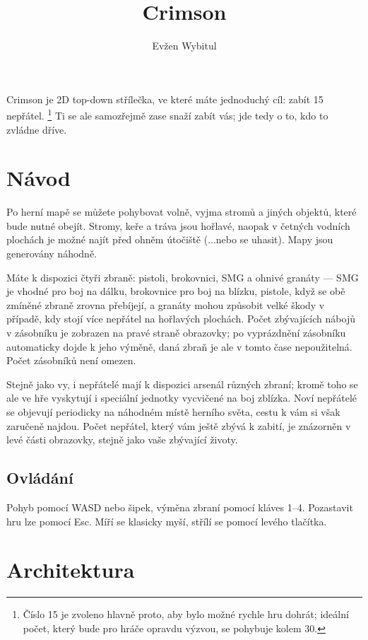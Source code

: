 \documentclass[BCOR=0pt]{scrartcl}
\title{Crimson}
\author{Evžen Wybitul}
\date{}
\begin{document}
\maketitle

Crimson je 2D top-down střílečka, ve které máte jednoduchý cíl: zabít 15 nepřátel. \footnote{Číslo 15 je zvoleno hlavně proto, aby bylo možné rychle hru dohrát; ideální počet, který bude pro hráče opravdu výzvou, se pohybuje kolem 30.} Ti se ale samozřejmě zase snaží zabít vás; jde tedy o to, kdo to zvládne dříve.

\section{Návod}

Po herní mapě se můžete pohybovat volně, vyjma stromů a jiných objektů, které bude nutné obejít. Stromy, keře a tráva jsou hořlavé, naopak v četných vodních plochách je možné najít před ohněm útočiště (...nebo se uhasit). Mapy jsou generovány náhodně.

Máte k dispozici čtyři zbraně: pistoli, brokovnici, SMG a ohnivé granáty --- SMG je vhodné pro boj na dálku, brokovnice pro boj na blízku, pistole, když se obě zmíněné zbraně zrovna přebíjejí, a granáty mohou způsobit velké škody v případě, kdy stojí více nepřátel na hořlavých plochách. Počet zbývajících nábojů v zásobníku je zobrazen na pravé straně obrazovky; po vyprázdnění zásobníku automaticky dojde k jeho výměně, daná zbraň je ale v tomto čase nepoužitelná. Počet zásobníků není omezen.

Stejně jako vy, i nepřátelé mají k dispozici arsenál různých zbraní; kromě toho se ale ve hře vyskytují i speciální jednotky vycvičené na boj zblízka. Noví nepřátelé se objevují periodicky na náhodném místě herního světa, cestu k vám si však zaručeně najdou. Počet nepřátel, který vám ještě zbývá k zabití, je znázorněn v levé části obrazovky, stejně jako vaše zbývající životy.

\subsection{Ovládání}

Pohyb pomocí WASD nebo šipek, výměna zbraní pomocí kláves 1--4. Pozastavit hru lze pomocí Esc. Míří se klasicky myší, střílí se pomocí levého tlačítka.

\section{Architektura}
\end{document}
